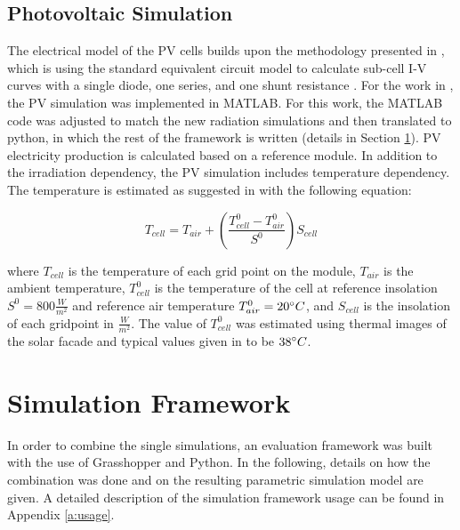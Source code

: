 		\subsection{Photovoltaic Simulation}
			The electrical model of the PV cells builds upon the methodology presented in \cite{hofer2016}, which is using the standard equivalent circuit model to calculate sub-cell I-V curves with a single diode, one series, and one shunt resistance \cite{mermoud2010}. For the work in \cite{hofer2016}, the PV simulation was implemented in MATLAB. For this work, the MATLAB code was adjusted to match the new radiation simulations and then translated to python, in which the rest of the framework is written (details in Section \ref{s:simulationFramework}). PV electricity production is calculated based on a reference module. In addition to the irradiation dependency, the PV simulation includes temperature dependency. The temperature is estimated as suggested in \cite{Ross_Smokler_1986} with the following equation:

			\begin{equation}
				T_{cell} = T_{air} + \left(\frac{T_{cell}^0-T_{air}^0}{S^0}\right)S_{cell}
	      		\label{e:temp}
			\end{equation}

			where $T_{cell}$ is the temperature of each grid point on the module, $T_{air}$ is the ambient temperature, $T_{cell}^0$ is the temperature of the cell at reference insolation $S^0=800\frac{W}{m^2}$ and reference air temperature $T_{air}^0=20\degree C$, and $S_{cell}$ is the insolation of each gridpoint in $\frac{W}{m^2}$. The value of $T_{cell}^0$ was estimated using thermal images of the solar facade and typical values given in \cite{Ross_Smokler_1986} to be $38\degree C$. 



	\section{Simulation Framework}
	\label{s:simulationFramework}
		In order to combine the single simulations, an evaluation framework was built with the use of Grasshopper and Python. In the following, details on how the combination was done and on the resulting parametric simulation model are given. A detailed description of the simulation framework usage can be found in Appendix \ref{a:usage}. 

